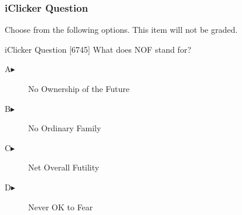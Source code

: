 \begin{frame}
  \frametitle{iClicker Question}
Choose from the following options. This item will not be graded.
\begin{block}{iClicker Question}
[6745] What does NOF stand for?
\end{block}
\begin{description}
\item[A\hspace{.2in}$\blacktriangleright$] No Ownership of the Future
\item[B\hspace{.2in}$\blacktriangleright$] No Ordinary Family
\item[C\hspace{.2in}$\blacktriangleright$] Net Overall Futility
\item[D\hspace{.2in}$\blacktriangleright$] Never OK to Fear
\end{description}
\end{frame}
